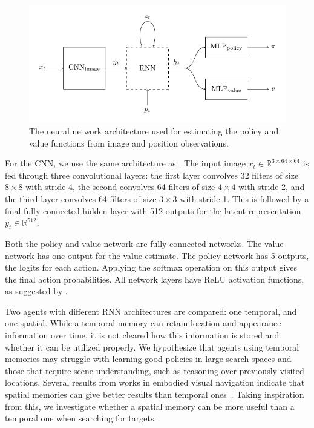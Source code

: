 \begin{figure}
    \centering
    \includegraphics{figures/architecture.pdf}
    \caption[Neural network architecture]{The neural network architecture used for estimating the policy and value functions from image and position observations.}
    \label{fig:architecture}
\end{figure}

For the CNN, we use the same architecture as \cite{mnih_human-level_2015}.
The input image \(x_t \in \mathbb{R}^{3 \times 64 \times 64}\) is fed through three convolutional layers: the first layer convolves 32 filters of size \(8 \times 8\) with stride 4, the second convolves 64 filters of size \(4 \times 4\) with stride 2, and the third layer convolves 64 filters of size \(3 \times 3\) with stride 1.
This is followed by a final fully connected hidden layer with 512 outputs for the latent representation \(y_t \in \mathbb{R}^{512}\).

Both the policy and value network are fully connected networks.
The value network has one output for the value estimate.
The policy network has 5 outputs, the logits for each action.
Applying the softmax operation on this output gives the final action probabilities.
All network layers have ReLU activation functions, as suggested by \cite{henderson_deep_2018}.

Two agents with different RNN architectures are compared: one temporal, and one spatial.
While a temporal memory can retain location and appearance information over time, it is not cleared how this information is stored and whether it can be utilized properly.
We hypothesize that agents using temporal memories may struggle with learning good policies in large search spaces and those that require scene understanding, such as reasoning over previously visited locations.
Several results from works in embodied visual navigation indicate that spatial memories can give better results than temporal ones~\cite{parisotto_neural_2017,henriques_mapnet_2018,gupta_cognitive_2019,chaplot_object_2020}.
Taking inspiration from this, we investigate whether a spatial memory can be more useful than a temporal one when searching for targets.

